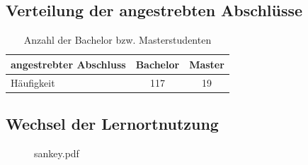 \documentclass[11pt, a4paper]{article}
\begin{document}
\subsection*{Verteilung der angestrebten Abschlüsse}
\begin{table}[h]
	\centering
	\begin{tabular}{l|cc}
		angestrebter Abschluss & Bachelor & Master \\ \hline
		Häufigkeit & 117 & 19
	\end{tabular}
	\vspace{0.5cm}
	\caption{Anzahl der Bachelor bzw. Masterstudenten}
\end{table}

\newpage
\subsection*{Wechsel der Lernortnutzung}
\vspace{-4cm}
\begin{figure}[h]
	 {sankey.pdf}
\end{figure}
\vspace{19.5cm} %
\begin{minipage}{\textwidth}
\end{minipage}
\end{document}
